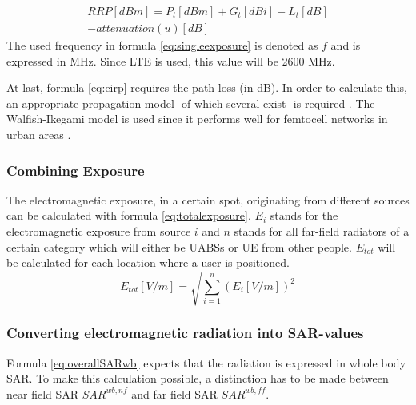 \documentclass[twocolumn]{phdsymp} %
\begin{document}
\begin{equation}
\begin{aligned}
RRP [dBm] = P_t [dBm] + G_t [dBi]- L_t [dB]\\
     - attenuation(u) [dB]
\end{aligned}
\label{eq:eirp}
\end{equation}
The used frequency in formula \ref{eq:singleexposure} is denoted as $f$ and is expressed in MHz. Since LTE is used, this value will be 2600 MHz.

At last, formula \ref{eq:eirp} requires the path loss (in dB). In order to calculate this, an appropriate propagation model -of which several exist- is required .
The Walfish-Ikegami model is used since it performs well for femtocell networks in urban areas \cite{J2}. %

\subsubsection{Combining Exposure}
The electromagnetic exposure, in a certain spot, originating from different sources can be calculated with formula \ref{eq:totalexposure}. $E_i$ stands for 
the electromagnetic exposure from source $i$ and
$n$ stands for all far-field radiators of a certain category which will either be UABSs or UE from other people.
$E_{tot}$ will be calculated for each location where a user is positioned.  
\begin{equation}
E_{tot} [V/m] = \sqrt{\sum_{i=1}^{n} (E_i [V/m]) ^2}
\label{eq:totalexposure}
\end{equation}

\subsubsection{Converting electromagnetic radiation into SAR-values}

Formula \ref{eq:overallSARwb} expects that the radiation is expressed in whole body \gls{SAR}.
To make this calculation possible, a distinction has to be made between near field \gls{SAR}
$SAR^{wb,nf}$ and far field \gls{SAR} $SAR^{wb,ff}$.
\end{document}
